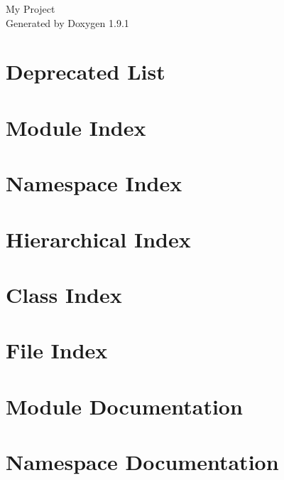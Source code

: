 \let\mypdfximage\pdfximage\def\pdfximage{\immediate\mypdfximage}\documentclass[twoside]{book}
\newcommand{\+}{\discretionary{\mbox{\scriptsize$\hookleftarrow$}}{}{}}
\newcommand{\clearemptydoublepage}{%
  \newpage{\pagestyle{empty}\cleardoublepage}%
}
\begin{document}
\raggedbottom

\hypersetup{pageanchor=false,
             bookmarksnumbered=true,
             pdfencoding=unicode
            }
\begin{titlepage}
\vspace*{7cm}
\begin{center}%
{\Large My Project }\\
\vspace*{1cm}
{\large Generated by Doxygen 1.9.1}\\
\end{center}
\end{titlepage}
\clearemptydoublepage
{}
\tableofcontents
\clearemptydoublepage
{}
\hypersetup{pageanchor=true}

\chapter{Deprecated List}
\label{deprecated}

\chapter{Module Index}

\chapter{Namespace Index}

\chapter{Hierarchical Index}

\chapter{Class Index}

\chapter{File Index}

\chapter{Module Documentation}





\chapter{Namespace Documentation}

\end{document}

